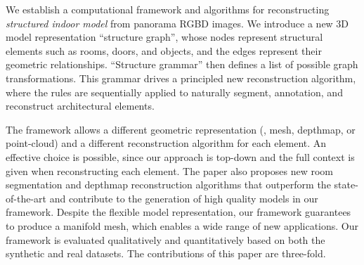 We establish a computational framework and algorithms for reconstructing
{\it structured indoor model} from panorama RGBD images.
We introduce a new 3D model representation ``structure graph'', whose
nodes represent structural elements such as rooms, doors, and objects,
and the edges represent their geometric relationships. ``Structure
grammar'' then defines a list of possible graph transformations. This
grammar drives a principled new reconstruction algorithm, where the
rules are sequentially applied to naturally segment, annotation, and
reconstruct architectural elements.


The framework allows a different geometric representation (\eg, mesh,
depthmap, or point-cloud) and a different reconstruction algorithm for each element. An effective choice is possible, since our
approach is top-down and the full context is given when reconstructing
each element. The paper also proposes new room segmentation and depthmap
reconstruction algorithms that outperform the state-of-the-art and
contribute to the generation of high quality models in our framework.
%
Despite the flexible model representation, our framework guarantees to
produce a manifold mesh, which enables a wide range of new
applications. Our framework is evaluated qualitatively and
quantitatively based on both the synthetic and real datasets.
The contributions of this paper are three-fold.
 
